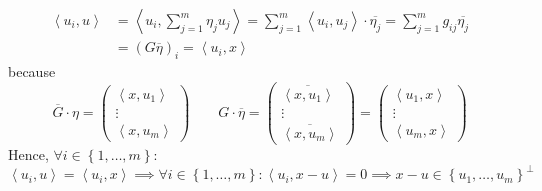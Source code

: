 \documentclass{article}
\numberwithin{lecref}{section}
\newcommand{\set}[1]{\left\{#1\right\}}
\newcommand{\ip}[2]{\left\langle#1,#2\right\rangle} %
\begin{document}
\begin{align*}
  \ip{u_i}{u} &= \ip{u_i}{\sum_{j=1}^m \eta_j u_j}
    = \sum_{j=1}^m \ip{u_i}{u_j} \cdot \overline{\eta_j}
    = \sum_{j=1}^m g_{ij} \overline{\eta_j} \\
    &= (G \overline{\eta})_i
    = \ip{u_i}{x}
\end{align*}
because
\[
  \overline G \cdot \eta = \begin{pmatrix} \ip{x}{u_1} \\ \vdots \\ \ip{x}{u_m} \end{pmatrix}  \qquad
  G \cdot \overline \eta = \begin{pmatrix}
    \overline{\ip{x}{u_1}} \\
    \vdots \\
    \overline{\ip{x}{u_m}}
  \end{pmatrix} =
  \begin{pmatrix}
    \ip{u_1}{x} \\
    \vdots \\ 
    \ip{u_m}{x}
  \end{pmatrix}
\]
Hence, $\forall i \in \set{1, \ldots, m}$:
\[ \ip{u_i}{u} = \ip{u_i}{x} \implies \forall i \in \set{1, \ldots, m}: \ip{u_i}{x - u} = 0 \implies x - u \in \set{u_1, \ldots, u_m}^\bot \]
\end{document}
